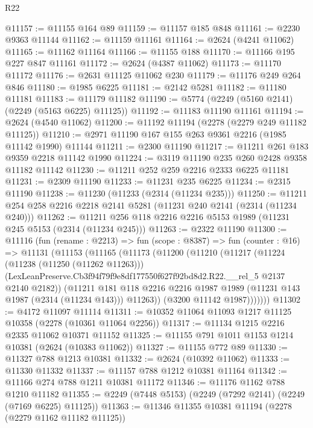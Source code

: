 \begin{lexlean}{R22}
\begin{coremodule}
@11157 := @11155 @164 @89
@11159 := @11157 @185 @848
@11161 := @2230 @9363 @11144
@11162 := @11159 @11161
@11164 := @2624 (@4241 @11062)
@11165 := @11162 @11164
@11166 := @11155 @188
@11170 := @11166 @195 @227 @847 @11161
@11172 := @2624 (@4387 @11062)
@11173 := @11170 @11172
@11176 := @2631 @11125 @11062 @230
@11179 := @11176 @249 @264 @846
@11180 := @1985 @6225
@11181 := @2142 @5281
@11182 := @11180 @11181
@11183 := @11179 @11182
@11190 := @5774 (@2249 (@5160 @2141) (@2249 (@5163 @6225) @11125))
@11192 := @11183 @11190 @11161
@11194 := @2624 (@4540 @11062)
@11200 := @11192 @11194 (@2278 (@2279 @249 @11182 @11125))
@11210 := @2971 @11190 @167 @155 @263 @9361 @2216 (@1985 @11142 @1990) @11144
@11211 := @2300 @11190
@11217 := @11211 @261 @183 @9359 @2218 @11142 @1990
@11224 := @3119 @11190 @235 @260 @2428 @9358 @11182 @11142
@11230 := @11211 @252 @259 @2216 @2333 @6225 @11181
@11231 := @2309 @11190
@11233 := @11231 @235 @6225
@11234 := @2315 @11190
@11238 := @11230 (@11233 (@2314 (@11234 @235)))
@11250 := @11211 @254 @258 @2216 @2218 @2141 @5281 (@11231 @240 @2141 (@2314 (@11234 @240)))
@11262 := @11211 @256 @118 @2216 @2216 @5153 @1989 (@11231 @245 @5153 (@2314 (@11234 @245)))
@11263 := @2322 @11190
@11300 := @11116
    (fun (rename : @2213) =>
    fun (scope : @8387) =>
    fun (counter : @16) =>
    @11131
      (@11153
        (@11165
          (@11173
            (@11200
              (@11210
                (@11217
                  (@11224
                    (@11238 (@11250 (@11262 @11263)))
                    (LexLeanPreserve.Cb3f94f79f9e8df177550f627f92bd8d2.R22.__rel_5
                      @2137
                      @2140
                      @2182))
                  (@11211
                    @181
                    @118
                    @2216
                    @2216
                    @1987
                    @1989
                    (@11231 @143 @1987 (@2314 (@11234 @143)))
                    @11263))
                (@3200 @11142 @1987)))))))
@11302 := @4172 @11097 @11114
@11311 := @10352 @11064 @11093 @1217 @11125 @10358 (@2278 (@10361 @11064 @2256))
@11317 := @11134 @1215 @2216 @2335 @11062 @10371 @11152
@11325 := @11155 @791 @1011 @1153 @1214 @10381 (@2624 (@10383 @11062))
@11327 := @11155 @772 @89
@11330 := @11327 @788 @1213 @10381
@11332 := @2624 (@10392 @11062)
@11333 := @11330 @11332
@11337 := @11157 @788 @1212 @10381 @11164
@11342 := @11166 @274 @788 @1211 @10381 @11172
@11346 := @11176 @1162 @788 @1210 @11182
@11355 := @2249 (@7448 @5153) (@2249 (@7292 @2141) (@2249 (@7169 @6225) @11125))
@11363 := @11346 @11355 @10381 @11194 (@2278 (@2279 @1162 @11182 @11125))

\end{coremodule}
\end{lexlean}
